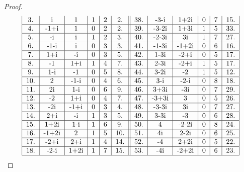 \documentclass[czech,bachelor,dept470,male]{diploma}
\begin{document}
\begin{proof}
\begin{equation*}
\begin{tabular}{|c|c|c|c|c|c||c|c|c|c|c|c|}
			3.  & i     & 1         & 1         & 2         & 2.   & 38. & -3-i  & 1+2i      & 0         & 7         & 15.  \\\hline
			4.  & -1+i  & 1         & 0         & 2         & 2.   & 39. & -3-2i & 1+3i      & 1         & 5         & 33.  \\\hline
			5.  & -i    & i         & 1         & 2         & 3.   & 40. & -2-3i & 3i        & 1         & 7         & 27.  \\\hline
			6.  & -1-i  & i         & 0         & 3         & 3.   & 41. & -1-3i & -1+2i     & 0         & 6         & 16.  \\\hline
			7.  & 1+i   & -i        & 0         & 3         & 5.   & 42. & 1-3i  & -2+i      & 0         & 5         & 17.  \\\hline
			8.  & -1    & 1+i       & 1         & 4         & 7.   & 43. & 2-3i  & -2+i      & 1         & 5         & 17.  \\\hline
			9.  & 1-i   & -1        & 0         & 5         & 8.   & 44. & 3-2i  & -2        & 1         & 5         & 12.  \\\hline
			10. & 2     & -1-i      & 0         & 4         & 6.   & 45. & 3-i   & -2-i      & 0         & 8         & 18.  \\\hline
			11. & 2i    & 1-i       & 0         & 6         & 9.   & 46. & 3+3i  & -3i       & 0         & 7         & 29.  \\\hline
			12. & -2    & 1+i       & 0         & 4         & 7.   & 47. & -3+3i & 3         & 0         & 5         & 26.  \\\hline
			13. & -2i   & -1+i      & 0         & 3         & 4.   & 48. & -3-3i & 3i        & 0         & 7         & 27.  \\\hline
			14. & 2+i   & -i        & 1         & 3         & 5.   & 49. & 3-3i  & -3        & 0         & 6         & 28.  \\\hline
			15. & 1+2i  & 1-i       & 1         & 6         & 9.   & 50. & 4     & -2-2i     & 0         & 8         & 24.  \\\hline
			16. & -1+2i & 2         & 1         & 5         & 10.  & 51. & 4i    & 2-2i      & 0         & 6         & 25.  \\\hline
			17. & -2+i  & 2+i       & 1         & 4         & 14.  & 52. & -4    & 2+2i      & 0         & 5         & 22.  \\\hline
			18. & -2-i  & 1+2i      & 1         & 7         & 15.  & 53. & -4i   & -2+2i     & 0         & 6         & 23.  \\\hline

\end{tabular}
\end{equation*}
\end{proof}
\end{document}
